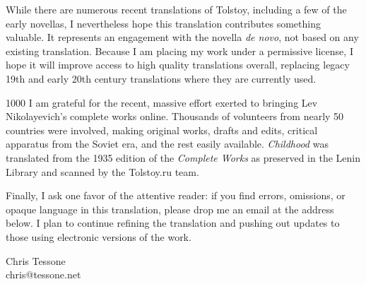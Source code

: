 While there are numerous recent translations of Tolstoy, including a few of the early novellas, I nevertheless hope this translation contributes something valuable. It represents an engagement with the novella \textit{de novo}, not based on any existing translation. Because I am placing my work under a permissive license, I hope it will improve access to high quality translations overall, replacing legacy 19th and early 20th century translations where they are currently used.

\begin{tolerant}{1000}
I am grateful for the recent, massive effort exerted to bringing Lev Nikolayevich's complete works online. Thousands of volunteers from nearly 50 countries were involved, making original works, drafts and edits, critical apparatus from the Soviet era, and the rest easily available. \textit{Childhood} was translated from the 1935 edition of the \textit{Complete Works} as preserved in the Lenin Library and scanned by the Tolstoy.ru team.
\end{tolerant}

Finally, I ask one favor of the attentive reader: if you find errors, omissions, or opaque language in this translation, please drop me an email at the address below. I plan to continue refining the translation and pushing out updates to those using electronic versions of the work.

\begin{flushright}
Chris Tessone\\
chris@tessone.net
\end{flushright}
